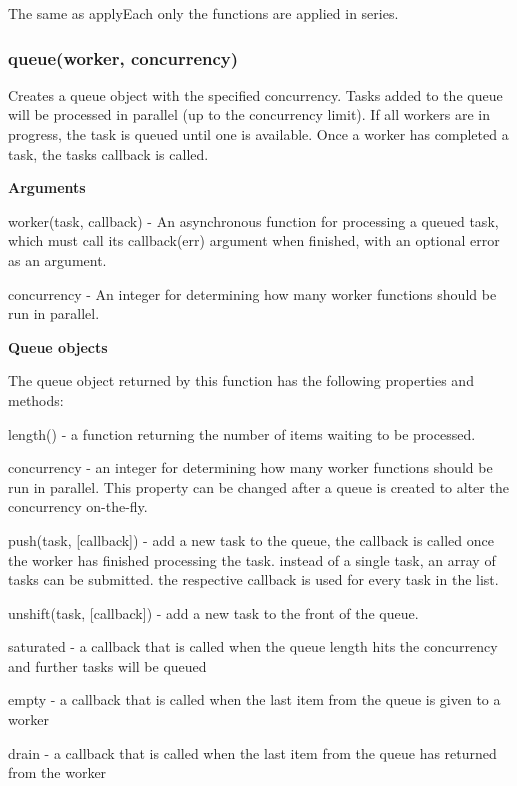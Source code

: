 The same as apply\+Each only the functions are applied in series. 



\label{_queue}%
 \subsubsection*{queue(worker, concurrency)}

Creates a queue object with the specified concurrency. Tasks added to the queue will be processed in parallel (up to the concurrency limit). If all workers are in progress, the task is queued until one is available. Once a worker has completed a task, the task\textquotesingle{}s callback is called.

{\bfseries Arguments}


\begin{DoxyItemize}
\item worker(task, callback) -\/ An asynchronous function for processing a queued task, which must call its callback(err) argument when finished, with an optional error as an argument.
\item concurrency -\/ An integer for determining how many worker functions should be run in parallel.
\end{DoxyItemize}

{\bfseries Queue objects}

The queue object returned by this function has the following properties and methods\+:


\begin{DoxyItemize}
\item length() -\/ a function returning the number of items waiting to be processed.
\item concurrency -\/ an integer for determining how many worker functions should be run in parallel. This property can be changed after a queue is created to alter the concurrency on-\/the-\/fly.
\item push(task, \mbox{[}callback\mbox{]}) -\/ add a new task to the queue, the callback is called once the worker has finished processing the task. instead of a single task, an array of tasks can be submitted. the respective callback is used for every task in the list.
\item unshift(task, \mbox{[}callback\mbox{]}) -\/ add a new task to the front of the queue.
\item saturated -\/ a callback that is called when the queue length hits the concurrency and further tasks will be queued
\item empty -\/ a callback that is called when the last item from the queue is given to a worker
\item drain -\/ a callback that is called when the last item from the queue has returned from the worker
\end{DoxyItemize}

